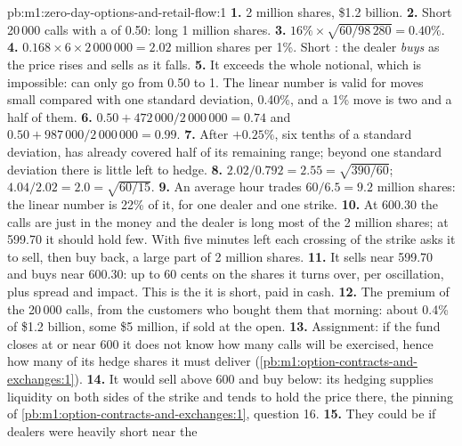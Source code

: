 \begin{solution}{pb:m1:zero-day-options-and-retail-flow:1}
\textbf{1.} 2 million shares, \$1.2 billion.
\textbf{2.} Short 20\,000 calls with a  of 0.50: long 1 million shares.
\textbf{3.} $16\% \times \sqrt{60/98\,280} = 0.40\%$.
\textbf{4.} $0.168 \times 6 \times 2\,000\,000 = 2.02$ million shares per 1\%.
Short : the dealer \emph{buys} as the price rises and sells as it falls.
\textbf{5.} It exceeds the whole notional, which is impossible:  can only
go from 0.50 to 1. The linear number is valid for moves small compared with
one standard deviation, 0.40\%, and a 1\% move is two and a half of them.
\textbf{6.} $0.50 + 472\,000/2\,000\,000 = 0.74$ and $0.50 + 987\,000/2\,000\,000 =
0.99$.
\textbf{7.} After $+0.25\%$, six tenths of a standard deviation,  has
already covered half of its remaining range; beyond one standard deviation
there is little left to hedge.
\textbf{8.} $2.02/0.792 = 2.55 = \sqrt{390/60}$; $4.04/2.02 = 2.0 =
\sqrt{60/15}$.
\textbf{9.} An average hour trades $60/6.5 = 9.2$ million shares: the linear
number is 22\% of it, for one dealer and one strike.
\textbf{10.} At 600.30 the calls are just in the money and the dealer is long
most of the 2 million shares; at 599.70 it should hold few. With five
minutes left each crossing of the strike asks it to sell, then buy back, a
large part of 2 million shares.
\textbf{11.} It sells near 599.70 and buys near 600.30: up to 60 cents on the
shares it turns over, per oscillation, plus spread and impact. This is the
 it is short, paid in cash.
\textbf{12.} The premium of the 20\,000 calls, from the customers who bought
them that morning: about 0.4\% of \$1.2 billion, some \$5 million, if sold at
the open.
\textbf{13.} Assignment: if the fund closes at or near 600 it does not know
how many calls will be exercised, hence how many of its hedge shares it must
deliver (\cref{pb:m1:option-contracts-and-exchanges:1}).
\textbf{14.} It would sell above 600 and buy below: its hedging supplies
liquidity on both sides of the strike and tends to hold the price there, the
pinning of \cref{pb:m1:option-contracts-and-exchanges:1}, question 16.
\textbf{15.} They could be if dealers were heavily short  near the

\end{solution}

